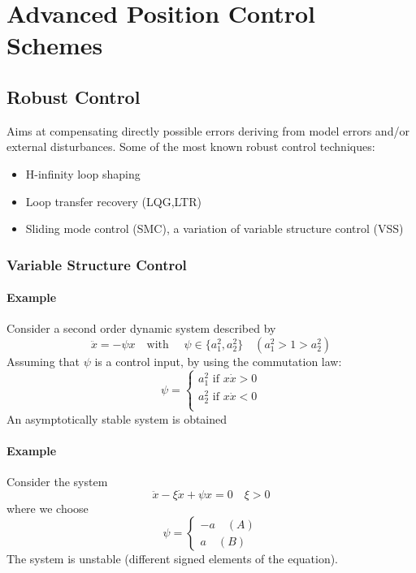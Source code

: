 \documentclass{book}
\begin{document}
\chapter{Advanced Position Control Schemes}









\section{Robust Control}
Aims at compensating directly possible errors deriving from model errors and/or external disturbances. Some of the most known robust control techniques:
\begin{itemize}
    \item H-infinity loop shaping
    \item Loop transfer recovery (LQG,LTR)
    \item Sliding mode control (SMC), a variation of variable structure control (VSS)
\end{itemize}
\subsection{Variable Structure Control}
\subsubsection{Example}
Consider a second order dynamic system described by 
\[
    \ddot{x}=-\psi x \quad \text{with } \quad \psi\in \{a_1^2,a_2^2\} \quad (a_1^2>1>a_2^2)
\]
Assuming that $\psi$ is a control input, by using the commutation law:
\[
    \psi=\begin{cases}
        a_1^2 \text{ if } x\dot{x}>0\\
        a_2^2 \text{ if } x\dot{x}<0\\
    \end{cases}
\]
An asymptotically stable system is obtained
\subsubsection{Example}
Consider the system
\[
    \ddot{x}-\xi \dot{x}+\psi x = 0 \quad \xi >0 
\]
where we choose
\[
    \psi = \begin{cases}
        -a \quad (A)\\
        a \quad (B)
    \end{cases}
\]
The system is unstable (different signed elements of the equation).
\end{document}
